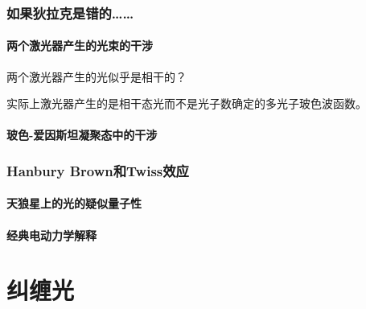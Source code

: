 \subsection{如果狄拉克是错的……}

\subsubsection{两个激光器产生的光束的干涉}

两个激光器产生的光似乎是相干的？

实际上激光器产生的是相干态光而不是光子数确定的多光子玻色波函数。

\subsubsection{玻色-爱因斯坦凝聚态中的干涉}

\subsection{Hanbury Brown和Twiss效应}

\subsubsection{天狼星上的光的疑似量子性}

\subsubsection{经典电动力学解释}

\chapter{纠缠光}